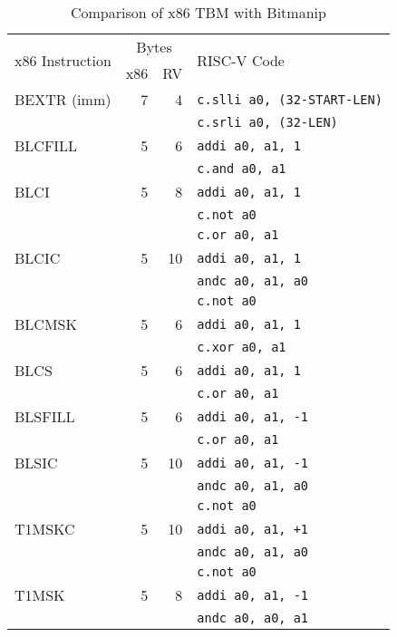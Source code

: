\begin{table}[h]
\centering
\begin{tabular}{lrrl}
\multirow{2}{*}{x86 Instruction} & \multicolumn{2}{c}{Bytes} & \multirow{2}{*}{RISC-V Code} \\
& x86 & RV & \\
\hline
BEXTR (imm)  & 7 &  4 & {\tt c.slli a0, (32-START-LEN)} \\
             &   &    & {\tt c.srli a0, (32-LEN)} \\
\hline
BLCFILL      & 5 &  6 & {\tt addi a0, a1, 1} \\
             &   &    & {\tt c.and a0, a1} \\
\hline
BLCI         & 5 &  8 & {\tt addi a0, a1, 1} \\
             &   &    & {\tt c.not a0} \\
             &   &    & {\tt c.or a0, a1} \\
\hline
BLCIC        & 5 & 10 & {\tt addi a0, a1, 1} \\
             &   &    & {\tt andc a0, a1, a0} \\
             &   &    & {\tt c.not a0} \\
\hline
BLCMSK       & 5 &  6 & {\tt addi a0, a1, 1} \\
             &   &    & {\tt c.xor a0, a1} \\
\hline
BLCS         & 5 &  6 & {\tt addi a0, a1, 1} \\
             &   &    & {\tt c.or a0, a1} \\
\hline
BLSFILL      & 5 &  6 & {\tt addi a0, a1, -1} \\
             &   &    & {\tt c.or a0, a1} \\
\hline
BLSIC        & 5 & 10 & {\tt addi a0, a1, -1} \\
             &   &    & {\tt andc a0, a1, a0} \\
             &   &    & {\tt c.not a0} \\
\hline
T1MSKC       & 5 & 10 & {\tt addi a0, a1, +1} \\
             &   &    & {\tt andc a0, a1, a0} \\
             &   &    & {\tt c.not a0} \\
\hline
T1MSK        & 5 &  8 & {\tt addi a0, a1, -1} \\
             &   &    & {\tt andc a0, a0, a1} \\
\end{tabular}
\caption{Comparison of x86 TBM with Bitmanip}
\label{tbm-comp}
\end{table}

